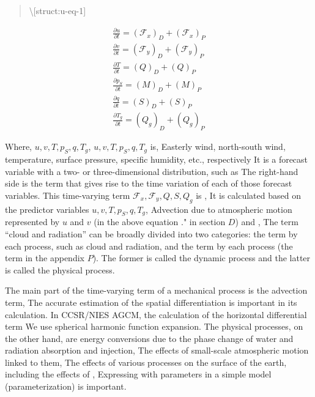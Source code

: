\begin{quote}
\protect\hypertarget{struct:u-eq-1}{}{\textbackslash{[}struct:u-eq-1{]}}
\end{quote}

\begin{eqnarray}
  \frac{\partial u}{\partial t}  =  \left( {\mathcal F}_x \right)_D + \left( {\mathcal F}_x \right)_P
   \\
  \frac{\partial v}{\partial t}  =  \left( {\mathcal F}_y \right)_D + \left( {\mathcal F}_y \right)_P \\
  \frac{\partial T}{\partial t}  =  \left( Q \right)_D + \left( Q \right)_P \\
  \frac{\partial p_S}{\partial t}  =  \left( M \right)_D + \left( M \right)_P \\
  \frac{\partial q}{\partial t}  =  \left( S \right)_D + \left( S \right)_P \\
  \frac{\partial T_g}{\partial t}  =  \left( Q_g \right)_D + \left( Q_g \right)_P
\end{eqnarray}

Where, \(u,v,T,p_S,q,T_g\), \(u,v,T,p_S,q,T_g\) is, Easterly wind,
north-south wind, temperature, surface pressure, specific humidity,
etc., respectively It is a forecast variable with a two- or
three-dimensional distribution, such as The right-hand side is the term
that gives rise to the time variation of each of those forecast
variables. This time-varying term
\({\mathcal F}_x,{\mathcal F}_y,Q,S,Q_g\) is , It is calculated based on
the predictor variables \(u,v,T,p_S,q,T_g\), Advection due to
atmospheric motion represented by \(u\) and \(v\) (in the above equation
." in section \(D\)) and , The term ``cloud and radiation'' can be
broadly divided into two categories: the term by each process, such as
cloud and radiation, and the term by each process (the term in the
appendix \(P\)). The former is called the dynamic process and the latter
is called the physical process.

The main part of the time-varying term of a mechanical process is the
advection term, The accurate estimation of the spatial differentiation
is important in its calculation. In CCSR/NIES AGCM, the calculation of
the horizontal differential term We use spherical harmonic function
expansion. The physical processes, on the other hand, are energy
conversions due to the phase change of water and radiation absorption
and injection, The effects of small-scale atmospheric motion linked to
them, The effects of various processes on the surface of the earth,
including the effects of , Expressing with parameters in a simple model
(parameterization) is important.

